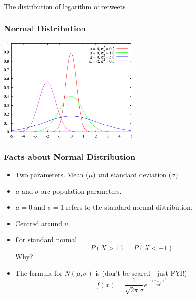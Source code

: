 \documentclass{beamer}\usepackage[]{graphicx}\usepackage[]{color}
\newenvironment{knitrout}{}{} %
\renewenvironment{knitrout}{\begin{spacing}{0.75}\begin{tiny}}{\end{tiny}\end{spacing}}
\begin{document}
\begin{frame}{The distribution of logarithm of retweets\;\;}
\begin{knitrout}
{}



\end{knitrout}
\newpage
\end{frame}

\begin{frame}[fragile]

\frametitle{Normal Distribution}
\begin{center}
\includegraphics[width=7cm,keepaspectratio]{Normal_distribution.png} 
\end{center}
\end{frame}

\begin{frame}[fragile]

\frametitle{ Facts about Normal Distribution}
\begin{itemize}
\item Two parameters. Mean ($\mu$) and standard deviation ($\sigma$) \pause
\item $\mu$ and $\sigma$ are population parameters. \pause
\item $\mu=0$ and $\sigma=1$ refers to the standard normal distribution. \pause
\item Centred around $\mu$.
\item For standard normal $$ P( X>1) = P( X <-1) $$ Why? 
\item The formula for $N(\mu, \sigma)$ is (don't be scared - just FYI!)
$$f(x) = \frac{1}{\sqrt{2\pi}\sigma}e^{-\frac{(x-\mu)^2}{2\sigma^2}} $$
\end{itemize}
\end{frame}
\end{document}
